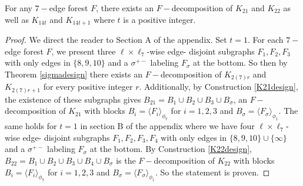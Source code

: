 \begin{thm} For any $7-$edge forest $F$, there exists an $F-$decomposition of $K_{21}$ and $K_{22}$ as well as $K_{14t}$ and $K_{14t+1}$ where $t$ is a positive integer.

    \begin{proof}
        We direct the reader to Section A of the appendix. Set $t=1$. For each $7-$edge forest $F$, we present three $\ell\times \ell_{7}$-wise edge- disjoint subgraphs $F_{1}, F_{2}, F_{3}$ with only edges in $\{8,9,10\}$ and a $\sigma^{+-}$ labeling $F_{\sigma}$ at the bottom. So then by Theorem \ref{sigmadesign} there exists an $F-$decomposition of $K_{2(7)r}$ and $K_{2(7)r+1}$ for every positive integer $r$. Additionally, by Construction \ref{K21design}, the existence of these subgraphs gives $B_{21}=B_{1}\cup B_{2}\cup B_{3}\cup B_{\sigma}$, an $F-$decomposition of $K_{21}$ with blocks $B_{i}=\langle F_{i}\rangle_{\phi_{7}}$ for $i=1,2,3$ and $B_{\sigma}=\langle F_{\sigma}\rangle_{\phi_{1}}$. The same holds for $t=1$ in section B of the appendix where we have four $\ell\times \ell_{7}$-wise edge- disjoint subgraphs $F_{1}, F_{2}, F_{3},F_{4}$ with only edges in $\{8,9,10\}\cup \{\infty\}$ and a $\sigma^{+-}$ labeling $F_{\sigma}$ at the bottom. By Construction \ref{K22design}, $B_{22}=B_{1}\cup B_{2}\cup B_{3}\cup B_{4}\cup B_{\sigma}$ is the $F-$decomposition of $K_{22}$ with blocks $B_{i}=\langle F_{i}\rangle_{\phi_{7}}$ for $i=1,2,3$ and $B_{\sigma}=\langle F_{\sigma}\rangle_{\phi_{1}}$. So the statement is proven. 
        
    \end{proof}
    
\end{thm}

